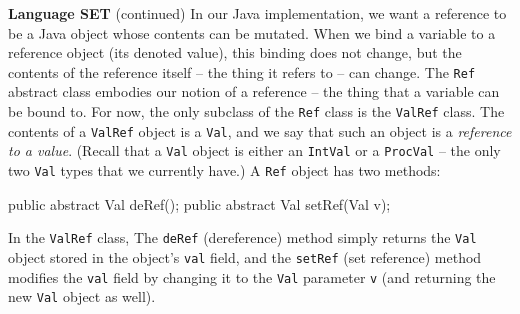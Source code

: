 \begin{minipage}[t]{\sw}
\slidenumber
\LARGE
{\bf Language SET} (continued)\exx
In our Java implementation, we want a reference to be
a Java object whose contents can be mutated.
When we bind a variable to a reference object (its denoted value),
this binding does not change,
but the contents of the reference itself --
the thing it refers to -- can change.\exx
The \verb'Ref' abstract class embodies our notion of a reference --
the thing that a variable can be bound to.
For now, the only subclass of the \verb'Ref' class is
the \verb'ValRef' class.\exx
{\Large\emm{}}\exx
The contents of a \verb'ValRef' object
is a \verb'Val',
and we say that such an object is a {\em reference to a value}.
(Recall that a \verb'Val' object is either
an \verb'IntVal' or a \verb'ProcVal' --
the only two \verb'Val' types that we currently have.)\exx
A \verb'Ref' object has two methods:
{\Large
\begin{qv}
public abstract Val deRef();
public abstract Val setRef(Val v);
\end{qv}
}
In the \verb'ValRef' class,
The \verb'deRef' (dereference) method simply returns
the \verb'Val' object stored in the object's \verb'val' field,
and the \verb'setRef' (set reference) method
modifies the \verb'val' field
by changing it to the \verb'Val' parameter \verb'v'
(and returning the new \verb'Val' object as well).
\end{minipage}
\clearpage
